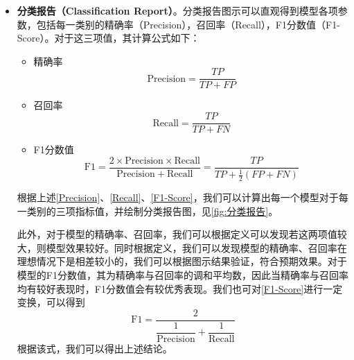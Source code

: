 \documentclass{MathModeling}
\begin{document}
\begin{itemize}
		\item \textbf{分类报告（Classification Report）}。分类报告图示可以直观得到模型各项参数，包括每一类别的精确率（Precision），召回率（Recall），F1分数值（F1-Score）。对于这三项值，其计算公式如下：
		\begin{itemize}
			\item {\heiti 精确率}
			\begin{equation}
				\mathrm{Precision} = \frac{TP}{TP+FP} \label{Precision}
			\end{equation}
			\item {\heiti 召回率}
			\begin{equation}
				\mathrm{Recall} = \frac{TP}{TP+FN} \label{Recall}
			\end{equation}
			\item {\heiti F1分数值} 
			\begin{equation}
				\mathrm{F}1 = \frac{2\times \mathrm{Precision}\times \mathrm{Recall}}{\mathrm{Precision}+\mathrm{Recall}}=\frac{TP}{TP+\frac{1}{2}\left(FP+FN\right)} \label{F1-Score}
			\end{equation}
		\end{itemize}
		根据上述\textcolor{blue}{\eqref{Precision}}、\textcolor{blue}{\eqref{Recall}}、\textcolor{blue}{\eqref{F1-Score}}，我们可以计算出每一个模型对于每一类别的三项指标值，并绘制分类报告图，见\textcolor{blue}{\cref{fig:分类报告}}。

		此外，对于模型的精确率、召回率，我们可以根据定义可以发现若这两项值较大，则模型效果较好。同时根据定义，我们可以发现模型的精确率、召回率在理想情况下是相差较小的，我们可以根据图示结果验证，符合预期效果。对于模型的F1分数值，其为精确率与召回率的调和平均数，因此当精确率与召回率均有较好表现时，F1分数值会有较优秀表现。我们也可对\textcolor{blue}{\eqref{F1-Score}}进行一定变换，可以得到
		\begin{equation}
			\mathrm{F}1=\frac{2}{\dfrac{1}{\mathrm{Precision}}+\dfrac{1}{\mathrm{Recall}}} \label{ReacllNew}
		\end{equation}
		根据该式，我们可以得出上述结论。


\end{itemize}
\end{document}

